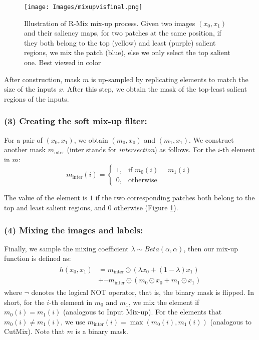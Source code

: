 \documentclass[letterpaper]{article} \usepackage[submission]{aaai23}  \usepackage{times}  \usepackage{helvet}  \usepackage{courier}  \usepackage[hyphens]{url}  \usepackage{graphicx} \urlstyle{rm} \def\UrlFont{\rm}  \usepackage{natbib}  \usepackage{caption} \frenchspacing  \setlength{\pdfpagewidth}{8.5in} \setlength{\pdfpageheight}{11in}
\newcommand{\mixup}{Input Mix-up}
\newcommand{\cutmix}{{CutMix}}
\begin{document}
\begin{figure}[t]
  \centering
  \texttt{[image: Images/mixupvisfinal.png]}
  \caption{Illustration of R-Mix mix-up process. Given two images $(x_0, x_1)$ and their saliency maps, for two patches at the same position, if they both belong to the top (yellow) and least (purple) salient regions, we mix the patch (blue), else we only select the top salient one. Best viewed in color}
  \label{fig:mixup}
\end{figure}

After construction, mask $m$ is up-sampled by replicating elements to match the size of the inputs $x$. After this step, we obtain the mask of the top-least salient regions of the inputs.


\subsubsection{(3) Creating the soft mix-up filter:} For a pair of $(x_0, x_1)$, we obtain $(m_0, x_0)$ and $(m_1, x_1)$. We construct another mask $m_{\text{inter}}$ (inter stands for \textit{intersection}) as follows. For the $i$-th element in $m$:
\begin{equation}
\label{intersec}
    m_{\text{inter}} (i)= 
\begin{cases}
    1, & \text{if } m_0 (i) = m_1 (i)\\
    0,              & \text{otherwise}
\end{cases}
\end{equation}


The value of the element is $1$ if the two corresponding patches both belong to the top and least salient regions, and $0$ otherwise (Figure \ref{fig:mixup}).


\subsubsection{(4) Mixing the images and labels:} Finally, we sample the mixing coefficient $\lambda \sim Beta(\alpha, \alpha)$, then our mix-up function is defined as:
\begin{align}
\label{mixup}
\begin{split}
    h(x_0, x_1) & = m_{\text{inter}} \odot (\lambda x_0 + (1-\lambda) x_1) \\ 
    & + \neg m_{\text{inter}} \odot (m_0 \odot x_0 + m_1 \odot x_1)  
\end{split}
\end{align}
where $\neg$ denotes the logical NOT operator, that is, the binary mask is flipped. In short, for the $i$-th element in $m_0$ and $m_1$, we mix the element if $m_0 (i) = m_1(i)$ (analogous to \mixup{}). For the elements that $m_0 (i) \neq m_1(i)$, we use $m_{\text{inter}}(i) = \max(m_0(i), m_1(i))$ (analogous to \cutmix{}). Note that $m$ is a binary mask.
\end{document}
